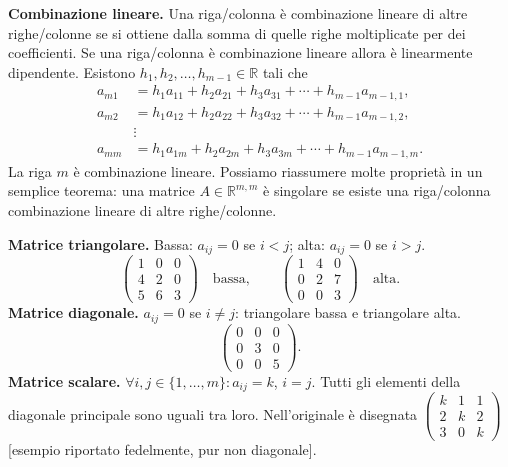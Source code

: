 \documentclass[11pt,a4paper]{article}
\newcommand{\pagina}[1]{\clearpage}
\begin{document}
\textbf{Combinazione lineare.} Una riga/colonna è combinazione lineare di altre righe/colonne se si ottiene dalla somma di quelle righe moltiplicate per dei coefficienti. Se una riga/colonna è combinazione lineare allora è linearmente dipendente.
Esistono $h_1,h_2,\ldots,h_{m-1}\in\mathbb R$ tali che
\begin{align*}
a_{m1}&=h_1a_{11}+h_2a_{21}+h_3a_{31}+\cdots+h_{m-1}a_{m-1,1},\\
a_{m2}&=h_1a_{12}+h_2a_{22}+h_3a_{32}+\cdots+h_{m-1}a_{m-1,2},\\&\vdots\\
a_{mm}&=h_1a_{1m}+h_2a_{2m}+h_3a_{3m}+\cdots+h_{m-1}a_{m-1,m}.
\end{align*}
La riga $m$ è combinazione lineare. Possiamo riassumere molte proprietà in un semplice teorema:
una matrice $A\in\mathbb R^{m,m}$ è singolare se esiste una riga/colonna combinazione lineare di altre righe/colonne.

\textbf{Matrice triangolare.} Bassa: $a_{ij}=0$ se $i<j$; alta: $a_{ij}=0$ se $i>j$.
\[\begin{pmatrix}1&0&0\\4&2&0\\5&6&3\end{pmatrix}\quad\text{bassa},\qquad
\begin{pmatrix}1&4&0\\0&2&7\\0&0&3\end{pmatrix}\quad\text{alta}.\]
\pagina{15}
\textbf{Matrice diagonale.} $a_{ij}=0$ se $i\ne j$: triangolare bassa e triangolare alta.
\[\begin{pmatrix}0&0&0\\0&3&0\\0&0&5\end{pmatrix}.\]
\textbf{Matrice scalare.} $\forall i,j\in\{1,\ldots,m\}:a_{ij}=k$, $i=j$. Tutti gli elementi della diagonale principale sono uguali tra loro.
Nell'originale è disegnata $\begin{pmatrix}k&1&1\\2&k&2\\3&0&k\end{pmatrix}$ [esempio riportato fedelmente, pur non diagonale].
\end{document}
